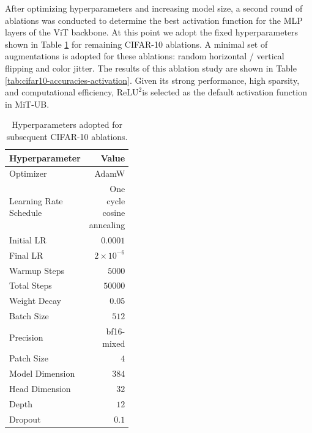 \documentclass[12pt]{article}
\newcommand{\reluTwo}{$\text{ReLU}^2$}
\begin{document}
After optimizing hyperparameters and increasing model size, a second round of ablations was conducted to determine the best activation function for the MLP layers of the ViT backbone.
At this point we adopt the fixed hyperparameters shown in Table \ref{tab:cifar10-hparams} for remaining CIFAR-10 ablations. 
A minimal set of augmentations is adopted for these ablations: random horizontal / vertical flipping and color jitter. The results of this ablation study are shown 
in Table \ref{tab:cifar10-accuracies-activation}. Given its strong performance, high sparsity, and computational efficiency, \reluTwo is selected as the default activation function in MiT-UB.

\begin{table}[H]
    \centering
    \begin{tabular}{p{0.4\linewidth}r}
        \toprule
        Hyperparameter & Value \\
        \midrule
        Optimizer & AdamW \\
        Learning Rate Schedule & One cycle cosine annealing \\
        Initial LR & \(0.0001\) \\
        Final LR & \(2 \times 10^{-6}\) \\
        Warmup Steps & \(5000\) \\
        Total Steps & \(50000\) \\
        Weight Decay & \(0.05\) \\
        \midrule
        Batch Size & \(512\) \\
        Precision & bf16-mixed \\
        \midrule
        Patch Size & \(4\) \\
        Model Dimension & \(384\) \\
        Head Dimension & \(32\) \\
        Depth & \(12\) \\
        Dropout & \(0.1\) \\
        \bottomrule
    \end{tabular}
    \caption{Hyperparameters adopted for subsequent CIFAR-10 ablations.}
    \label{tab:cifar10-hparams}
\end{table}
\end{document}
